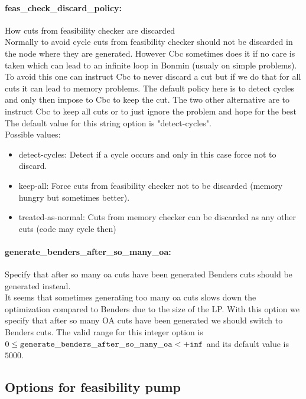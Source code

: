 \paragraph{\bf feas\_check\_discard\_policy:}\label{sec:feas_check_discard_policy} How cuts from feasibility checker are discarded $\;$ \\
 Normally to avoid cycle cuts from feasibility
checker should not be discarded in the node where
they are generated. However Cbc sometimes does it
if no care is taken which can lead to an infinite
loop in Bonmin (usualy on simple problems). To
avoid this one can instruct Cbc to never discard
a cut but if we do that for all cuts it can lead
to memory problems. The default policy here is to
detect cycles and only then impose to Cbc to keep
the cut. The two other alternative are to
instruct Cbc to keep all cuts or to just ignore
the problem and hope for the best
The default value for this string option is "detect-cycles".
\\ 
Possible values:
\begin{itemize}
   \item detect-cycles: Detect if a cycle occurs and only in this case
force not to discard.
   \item keep-all: Force cuts from feasibility checker not to be
discarded (memory hungry but sometimes better).
   \item treated-as-normal: Cuts from memory checker can be discarded as
any other cuts (code may cycle then)
\end{itemize}

\paragraph{\bf generate\_benders\_after\_so\_many\_oa:}\label{sec:generate_benders_after_so_many_oa} Specify that after so many oa cuts have been generated Benders cuts should be generated instead. $\;$ \\
 It seems that sometimes generating too many oa
cuts slows down the optimization compared to
Benders due to the size of the LP. With this
option we specify that after so many OA cuts have
been generated we should switch to Benders cuts. The valid range for this integer option is
$0 \le {\tt generate\_benders\_after\_so\_many\_oa } <  {\tt +inf}$
and its default value is $5000$.


\subsection{Options for feasibility pump}
\label{sec:Options_for_feasibility_pump}
